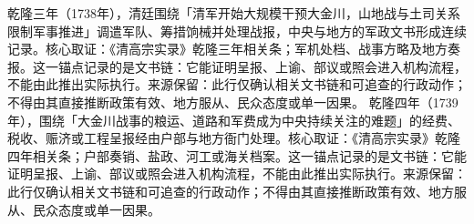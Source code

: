 乾隆三年（1738年），清廷围绕「清军开始大规模干预大金川，山地战与土司关系限制军事推进」调遣军队、筹措饷械并处理战报，中央与地方的军政文书形成连续记录。核心取证：《清高宗实录》乾隆三年相关条；军机处档、战事方略及地方奏报。这一锚点记录的是文书链：它能证明呈报、上谕、部议或照会进入机构流程，不能由此推出实际执行。来源保留：此行仅确认相关文书链和可追查的行政动作；不得由其直接推断政策有效、地方服从、民众态度或单一因果。
乾隆四年（1739年），围绕「大金川战事的粮运、道路和军费成为中央持续关注的难题」的经费、税收、赈济或工程呈报经由户部与地方衙门处理。核心取证：《清高宗实录》乾隆四年相关条；户部奏销、盐政、河工或海关档案。这一锚点记录的是文书链：它能证明呈报、上谕、部议或照会进入机构流程，不能由此推出实际执行。来源保留：此行仅确认相关文书链和可追查的行政动作；不得由其直接推断政策有效、地方服从、民众态度或单一因果。
